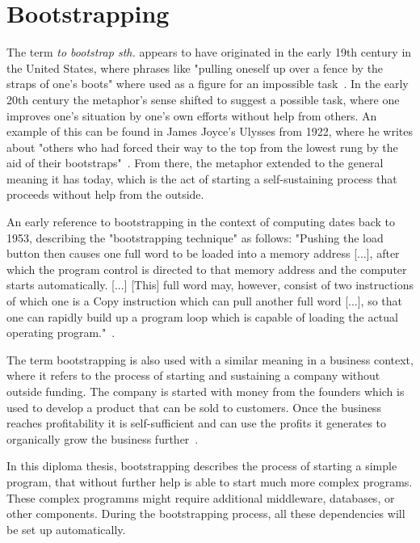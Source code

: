 \section{Bootstrapping}

The term \textit{to bootstrap sth.} appears to have originated in the early 19th century in the United States, where phrases like "pulling oneself up over a fence by the straps of one's boots" where used as a figure for an impossible task~\autocite{bootstrap:history}.
In the early 20th century the metaphor's sense shifted to suggest a possible task, where one improves one's situation by one's own efforts without help from others.
An example of this can be found in James Joyce's Ulysses from 1922, where he writes about "others who had forced their way to the top from the lowest rung by the aid of their bootstraps"~\autocite{bootstrap:ulysses}.
From there, the metaphor extended to the general meaning it has today, which is the act of starting a self-sustaining process that proceeds without help from the outside.

An early reference to bootstrapping in the context of computing dates back to 1953, describing the "bootstrapping technique" as follows: "Pushing the load button then causes one full word to be loaded into a memory address [...], after which the program control is directed to that memory address and the computer starts automatically. [...] [This] full word may, however, consist of two instructions of which one is a Copy instruction which can pull another full word [...], so that one can rapidly build up a program loop which is capable of loading the actual operating program."~\autocite[p.~1273]{bootstrap:early}.

The term bootstrapping is also used with a similar meaning in a business context, where it refers to the process of starting and sustaining a company without outside funding.
The company is started with money from the founders which is used to develop a product that can be sold to customers.
Once the business reaches profitability it is self-sufficient and can use the profits it generates to organically grow the business further~\autocite{bootstrap:business}.

In this diploma thesis, bootstrapping describes the process of starting a simple program, that without further help is able to start much more complex programs.
These complex programms might require additional middleware, databases, or other components.
During the bootstrapping process, all these dependencies will be set up automatically.
